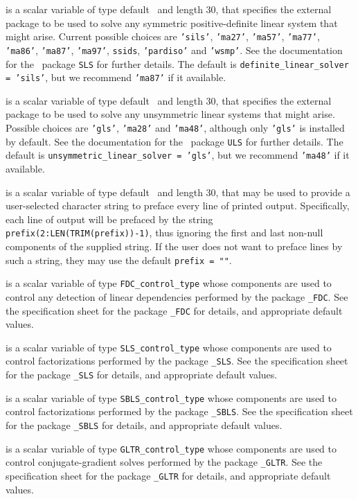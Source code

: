\begin{description}
 is a scalar variable of type default \character\
and length 30, that specifies the external package to be used to
solve any symmetric positive-definite linear system that might arise.
Current possible
choices are {\tt 'sils'}, {\tt 'ma27'}, {\tt 'ma57'}, {\tt 'ma77'},
{\tt 'ma86'}, {\tt 'ma87'}, {\tt 'ma97'}, {\tt ssids}, {\tt 'pardiso'}
and {\tt 'wsmp'}.
See the documentation for the \galahad\ package {\tt SLS} for further details.
The default is {\tt definite\_linear\_solver = 'sils'},
but we recommend {\tt 'ma87'} if it available.

 is a scalar variable of type default
\character\
and length 30, that specifies the external package to be used to
solve any unsymmetric linear systems that might arise. Possible
choices are
{\tt 'gls'},
{\tt 'ma28'}
and
{\tt 'ma48'},
although only {\tt 'gls'} is installed by default.
See the documentation for the \galahad\ package {\tt ULS} for further details.
The default is {\tt unsymmetric\_linear\_solver = 'gls'},
but we recommend {\tt 'ma48'} if it available.

 is a scalar variable of type default \character\
and length 30, that may be used to provide a user-selected
character string to preface every line of printed output.
Specifically, each line of output will be prefaced by the string
{\tt prefix(2:LEN(TRIM(prefix))-1)},
thus ignoring the first and last non-null components of the
supplied string. If the user does not want to preface lines by such
a string, they may use the default {\tt prefix = ""}.

\itt{FDC\_control} is a scalar variable of type
{\tt FDC\_control\_type}
whose components are used to control any detection of linear dependencies
performed by the package
{\tt \libraryname\_FDC}.
See the specification sheet for the package
{\tt \libraryname\_FDC}
for details, and appropriate default values.

\itt{SLS\_control} is a scalar variable of type
{\tt SLS\_control\_type}
whose components are used to control factorizations
performed by the package
{\tt \libraryname\_SLS}.
See the specification sheet for the package
{\tt \libraryname\_SLS}
for details, and appropriate default values.

\itt{SBLS\_control} is a scalar variable of type
{\tt SBLS\_control\_type}
whose components are used to control factorizations
performed by the package
{\tt \libraryname\_SBLS}.
See the specification sheet for the package
{\tt \libraryname\_SBLS}
for details, and appropriate default values.

\itt{GLTR\_control} is a scalar variable of type
{\tt GLTR\_control\_type}
whose components are used to control conjugate-gradient solves
performed by the package
{\tt \libraryname\_GLTR}.
See the specification sheet for the package
{\tt \libraryname\_GLTR}
for details, and appropriate default values.

\end{description}
